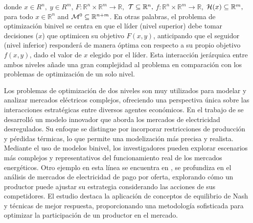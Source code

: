 donde $
x \in R^{n}, \; y \in R^{m}$,  $F : \mathbb{R}^{n} \times \mathbb{R}^{m} \to \mathbb{R}, $
  $  {\cal{T} }\subseteq \mathbb{R}^n ,$ $ f : \mathbb{R}^{n} \times \mathbb{R}^{m} \to \mathbb{R} ,
    $ $ {\cal{H}}(x) \subseteq \mathbb{R}^m ,$ para todo $x\in  \mathbb{R}^{n}$ and 
$
   {\cal{ M}}^0 \subseteq \mathbb{R}^{n + m}$.
En otras palabras, el problema de optimización binivel se centra en que el líder (nivel superior) debe tomar decisiones ($x$) que optimicen su objetivo $F(x, y)$, anticipando que el seguidor (nivel inferior) responderá de manera óptima con respecto a su propio objetivo $f(x, y)$, dado el valor de $x$ elegido por el líder. Esta interacción jerárquica entre ambos niveles añade una gran complejidad al problema en comparación con los problemas de optimización de un solo nivel.

Los problemas de optimización de dos niveles son muy utilizados para modelar y analizar mercados eléctricos complejos, ofreciendo una perspectiva única sobre las interacciones estratégicas entre diversos agentes económicos.
En el trabajo de  \cite{Aussel2016DeregulatedEM} se desarrolló un modelo innovador que aborda los mercados de electricidad desregulados. Su enfoque se distingue por incorporar restricciones de producción y pérdidas térmicas, lo que permite una modelización más precisa y realista. Mediante el uso de modelos binivel, los investigadores pueden explorar escenarios más complejos y representativos del funcionamiento real de los mercados energéticos.
Otro ejemplo en esta línea se encuentra en \cite{Aussel2017NashEI}, se profundiza en el análisis de mercados de electricidad de pago por oferta, explorando cómo un productor puede ajustar su estrategia considerando las acciones de sus competidores. El estudio destaca la aplicación de conceptos de equilibrio de Nash y técnicas de mejor respuesta, proporcionando una metodología sofisticada para optimizar la participación de un productor en el mercado.


